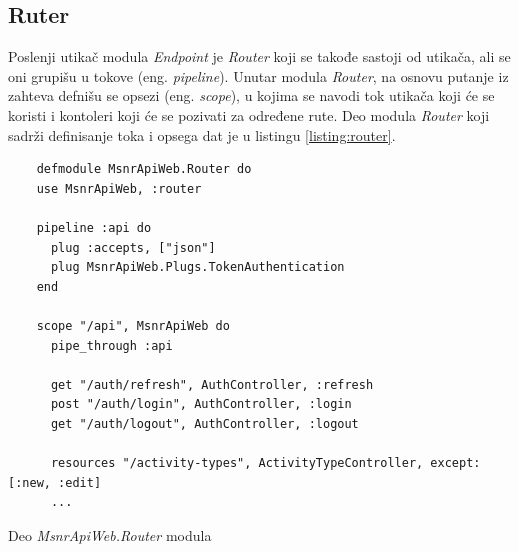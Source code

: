 \documentclass[12pt,oneside]{memoir}
\begin{document}
\subsection{Ruter}
Poslenji utikač modula \emph{Endpoint} je \emph{Router} koji se takođe sastoji od utikača, ali se oni grupišu
u tokove (eng. \emph{pipeline}). Unutar modula \emph{Router}, na osnovu putanje iz zahteva defnišu se opsezi
(eng. \emph{scope}), u kojima se navodi tok utikača koji će se koristi i kontoleri koji će se pozivati za određene rute.
Deo modula \emph{Router} koji sadrži definisanje toka i opsega dat je u listingu \ref{listing:router}.
\begin{listing}[!h]
  \begin{verbatim}
    defmodule MsnrApiWeb.Router do
    use MsnrApiWeb, :router
  
    pipeline :api do
      plug :accepts, ["json"]
      plug MsnrApiWeb.Plugs.TokenAuthentication
    end
  
    scope "/api", MsnrApiWeb do
      pipe_through :api
  
      get "/auth/refresh", AuthController, :refresh
      post "/auth/login", AuthController, :login
      get "/auth/logout", AuthController, :logout
  
      resources "/activity-types", ActivityTypeController, except: [:new, :edit]
      ...
\end{verbatim}
\caption{Deo \emph{MsnrApiWeb.Router} modula}
\label{listing:router}
\end{listing}
\end{document}
